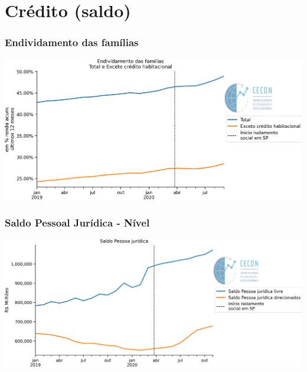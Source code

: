 \documentclass{SelfArx}
\begin{document}
\section*{Crédito (saldo)}
\label{sec:org9bbb4f2}

\subsubsection*{Endividamento das famílias}
\label{sec:orgcd81eab}

\begin{center}
\includegraphics[width=.9\linewidth]{./figs/Credito/EndividamentoFamilias.png}
\end{center}


\subsubsection*{Saldo Pessoal Jurídica - Nível}
\label{sec:org1bbf484}

\begin{center}
\includegraphics[width=.9\linewidth]{./figs/Credito/SaldoPJ.png}
\end{center}
\end{document}
